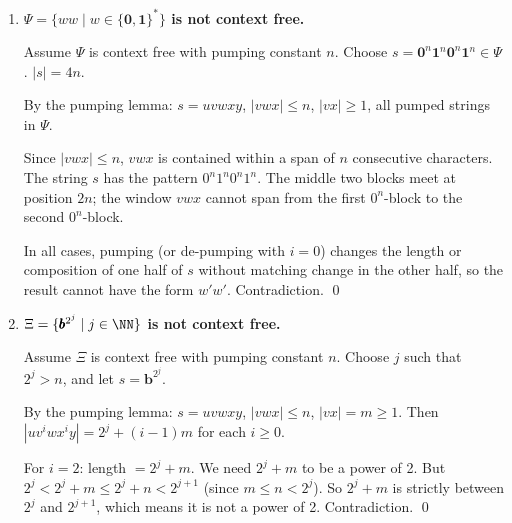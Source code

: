 \begin{enumerate}[{9.}1. ]
\begin{itemize}
\item If $vwx$ does contain the separator $\pmb{2}$, then there is only one
occurrence of $\pmb{2}$ in $s$.  If $\pmb{2}$ appears in $vx$, then pumping with
$i=0$ or $i=2$ changes the number of $\pmb{2}$'s, so the pumped word is not in
$\Gamma$.

\item The only remaining possibility is that $\pmb{2}$ lies in $w$ but not in
$vx$.  Then pumping changes symbols on one side of $\pmb{2}$ while leaving the
other side and the separator itself unchanged.  Again the two halves around the
separator are no longer identical, so the pumped word is not in $\Gamma$.
\end{itemize}

In every case some pumped word lies outside $\Gamma$, contradicting the pumping
lemma.  Therefore $\Gamma$ is not context free. \qed

\item \textbf{$\Psi = \{ww \mid w \in \{\pmb{0},\pmb{1}\}^*\}$ is not context free.}

Assume $\Psi$ is context free with pumping constant $n$. Choose $s = \pmb{0}^n\pmb{1}^n\pmb{0}^n\pmb{1}^n \in \Psi$. $|s| = 4n$.

By the pumping lemma: $s = uvwxy$, $|vwx| \leq n$, $|vx| \geq 1$, all pumped strings in $\Psi$.

Since $|vwx| \leq n$, $vwx$ is contained within a span of $n$ consecutive characters. The string $s$ has the pattern $0^n1^n0^n1^n$. The middle two blocks meet at position $2n$; the window $vwx$ cannot span from the first $0^n$-block to the second $0^n$-block.

In all cases, pumping (or de-pumping with $i=0$) changes the length or composition of one half of $s$ without matching change in the other half, so the result cannot have the form $w'w'$. Contradiction. \qed

\item \textbf{$\Xi = \{\pmb{b}^{2^j} \mid j \in \NN\}$ is not context free.}

Assume $\Xi$ is context free with pumping constant $n$. Choose $j$ such that $2^j > n$, and let $s = \pmb{b}^{2^j}$.

By the pumping lemma: $s = uvwxy$, $|vwx| \leq n$, $|vx| = m \geq 1$. Then $|uv^i wx^i y| = 2^j + (i-1)m$ for each $i \geq 0$.

For $i=2$: length $= 2^j + m$. We need $2^j + m$ to be a power of 2. But $2^j < 2^j + m \leq 2^j + n < 2^{j+1}$ (since $m \leq n < 2^j$). So $2^j + m$ is strictly between $2^j$ and $2^{j+1}$, which means it is not a power of 2. Contradiction. \qed


\end{enumerate}
